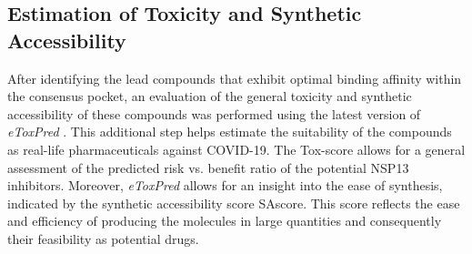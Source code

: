 \documentclass[11pt, letterpaper, titlepage]{article}
\renewcommand{\cite}{\parencite}
\begin{document}

\subsection{Estimation of Toxicity and Synthetic Accessibility}
After identifying the lead compounds that exhibit optimal binding affinity within the consensus pocket, an evaluation of the general toxicity and synthetic accessibility of these compounds was performed using the latest version of \textit{eToxPred} \cite{pu2019toxpred}. This additional step helps estimate the suitability of the compounds as real-life pharmaceuticals against COVID-19. The Tox-score allows for a general assessment of the predicted risk vs. benefit ratio of the potential NSP13 inhibitors. Moreover, \textit{eToxPred} allows for an insight into the ease of synthesis, indicated by the synthetic accessibility score \ac{SAscore}. This score reflects the ease and efficiency of producing the molecules in large quantities and consequently their feasibility as potential drugs. 
\end{document}
